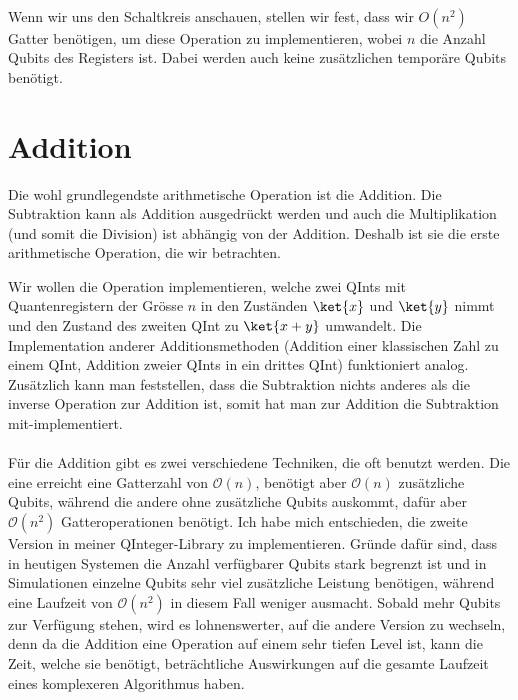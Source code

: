 \paragraph{}
Wenn wir uns den Schaltkreis anschauen, stellen wir fest, dass wir $O(n^2)$ Gatter benötigen, um diese Operation zu implementieren, wobei $n$ die Anzahl Qubits des Registers ist. Dabei werden auch keine zusätzlichen temporäre Qubits benötigt. 

\section{Addition}
Die wohl grundlegendste arithmetische Operation ist die Addition. Die Subtraktion kann als Addition ausgedrückt werden und auch die Multiplikation (und somit die Division) ist abhängig von der Addition. Deshalb ist sie die erste arithmetische Operation, die wir betrachten. 

Wir wollen die Operation implementieren, welche zwei QInts mit Quantenregistern der Grösse $n$ in den Zuständen $\ket{x}$ und $\ket{y}$ nimmt und den Zustand des zweiten QInt zu $\ket{x + y}$ umwandelt. Die Implementation anderer Additionsmethoden (Addition einer klassischen Zahl zu einem QInt, Addition zweier QInts in ein drittes QInt) funktioniert analog. Zusätzlich kann man feststellen, dass die Subtraktion nichts anderes als die inverse Operation zur Addition ist, somit hat man zur Addition die Subtraktion mit-implementiert.

\paragraph{}

Für die Addition gibt es zwei verschiedene Techniken, die oft benutzt werden. Die eine erreicht eine Gatterzahl von $\mathcal O(n)$, benötigt aber $\mathcal O(n)$ zusätzliche Qubits, während die andere ohne zusätzliche Qubits auskommt, dafür aber $\mathcal O(n^2)$ Gatteroperationen benötigt. Ich habe mich entschieden, die zweite Version in meiner QInteger-Library zu implementieren. Gründe dafür sind, dass in heutigen Systemen die Anzahl verfügbarer Qubits stark begrenzt ist und in Simulationen einzelne Qubits sehr viel zusätzliche Leistung benötigen, während eine Laufzeit von $\mathcal O(n^2)$ in diesem Fall weniger ausmacht. Sobald mehr Qubits zur Verfügung stehen, wird es lohnenswerter, auf die andere Version zu wechseln, denn da die Addition eine Operation auf einem sehr tiefen Level ist, kann die Zeit, welche sie benötigt, beträchtliche Auswirkungen auf die gesamte Laufzeit eines komplexeren Algorithmus haben.

